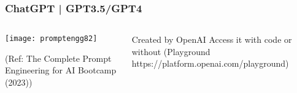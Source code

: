 








\begin{frame}[fragile]\frametitle{ChatGPT | GPT3.5/GPT4}


\begin{columns}
    \begin{column}[T]{0.6\linewidth}
		\begin{center}
		\texttt{[image: promptengg82]}

		{\tiny (Ref: The Complete Prompt Engineering for AI Bootcamp (2023))}
		\end{center}	
    \end{column}
    \begin{column}[T]{0.4\linewidth}
		Created by OpenAI
		Access it with code or without (Playground https://platform.openai.com/playground)
    \end{column}
  \end{columns}
\end{frame}


